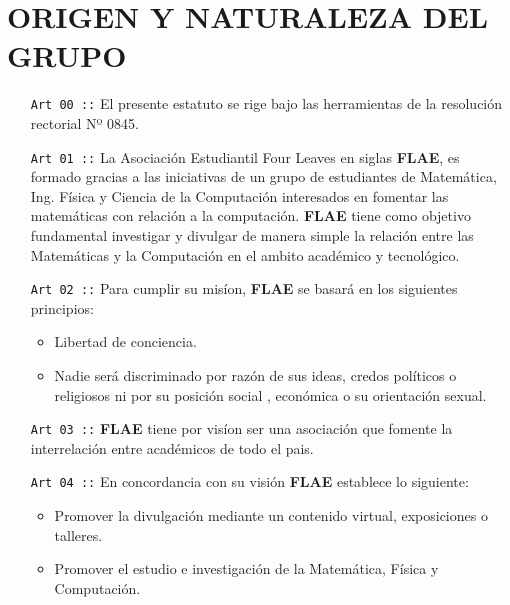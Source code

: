 \chapter{ORIGEN Y NATURALEZA DEL GRUPO}

\begin{itemize}
  \item [\texttt{Art 00 ::}] El presente estatuto se rige bajo las herramientas de la resolución rectorial Nº 0845.
  \item [\texttt{Art 01 ::}] La Asociación Estudiantil Four Leaves en siglas \textbf{FLAE}, es formado gracias a las iniciativas de un grupo de estudiantes de Matemática, Ing. Física y Ciencia de la Computación interesados en fomentar las matemáticas con relación a la computación. \textbf{FLAE} tiene como objetivo fundamental investigar y divulgar de manera simple la relación entre las Matemáticas y la Computación en el ambito académico y tecnológico.
  \item [\texttt{Art 02 ::}] Para cumplir su misíon, \textbf{FLAE} se basará en los siguientes principios:
  \begin{itemize}
    \item Libertad de conciencia.
    \item Nadie será discriminado por razón de sus ideas, credos políticos o religiosos ni por su posición social , económica o su orientación sexual.
  \end{itemize}
  \item [\texttt{Art 03 ::}] \textbf{FLAE}  tiene por visíon ser una asociación que fomente la interrelación entre académicos de todo el pais.
  \item [\texttt{Art 04 ::}] En concordancia con su visión \textbf{FLAE}  establece lo siguiente:
  \begin{itemize}
    \item Promover la divulgación mediante un contenido virtual, exposiciones o talleres.
    \item Promover el estudio e investigación de la Matemática, Física y Computación.

  \end{itemize}
\end{itemize}



